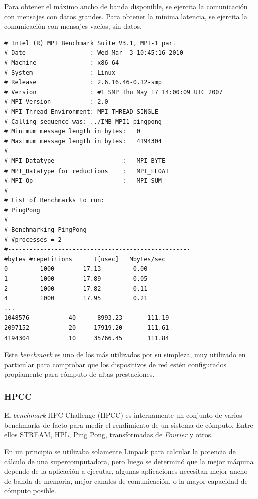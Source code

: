 \documentclass[a4paper]{report}
\begin{document}
\bigskip

Para obtener el m\'aximo ancho de banda disponible, se ejercita la comunicaci\'on con mensajes con datos grandes.
Para obtener la m\'inima latencia, se ejercita la comunicaci\'on con mensajes vac\'ios, sin datos.

\begin{verbatim}
# Intel (R) MPI Benchmark Suite V3.1, MPI-1 part
# Date                  : Wed Mar  3 10:45:16 2010
# Machine               : x86_64
# System                : Linux
# Release               : 2.6.16.46-0.12-smp
# Version               : #1 SMP Thu May 17 14:00:09 UTC 2007
# MPI Version           : 2.0
# MPI Thread Environment: MPI_THREAD_SINGLE
# Calling sequence was: ../IMB-MPI1 pingpong
# Minimum message length in bytes:   0
# Maximum message length in bytes:   4194304
#
# MPI_Datatype                   :   MPI_BYTE
# MPI_Datatype for reductions    :   MPI_FLOAT
# MPI_Op                         :   MPI_SUM
#
# List of Benchmarks to run:
# PingPong
#---------------------------------------------------
# Benchmarking PingPong
# #processes = 2
#---------------------------------------------------
#bytes #repetitions      t[usec]   Mbytes/sec
0         1000        17.13         0.00
1         1000        17.89         0.05
2         1000        17.82         0.11
4         1000        17.95         0.21
...
1048576           40      8993.23       111.19
2097152           20     17919.20       111.61
4194304           10     35766.45       111.84
\end{verbatim}

Este {\it benchmark} es uno de los m\'as utilizados por su simpleza, muy utilizado
en particular para comprobar que los dispositivos de red est\'en configurados propiamente para c\'omputo
de altas prestaciones.

\subsubsection{HPCC}

El {\it benchmark} HPC Challenge \cite{hpcc} (HPCC) es internamente un conjunto de
varios benchmarks de-facto para medir el rendimiento de un sistema de
c\'omputo. Entre ellos STREAM, HPL, Ping Pong, transformadas de {\it Fourier}
y otros.

\bigskip

En un principio se utilizaba solamente Linpack para calcular la potencia
de c\'alculo de una supercomputadora, pero luego se determin\'o que la mejor
m\'aquina depende de la aplicaci\'on a ejecutar, algunas aplicaciones
necesitan mejor ancho de banda de memoria, mejor canales de comunicaci\'on, o
la mayor capacidad de c\'omputo posible.
\end{document}
